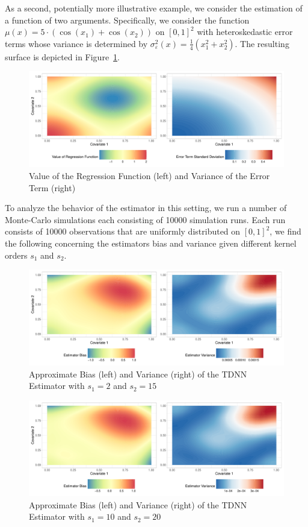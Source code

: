 \newpage
As a second, potentially more illustrative example, we consider the estimation of a function of two arguments.
Specifically, we consider the function $\mu(x) = 5 \cdot \left(\cos(x_1) + \cos(x_2)\right)$ on $[0,1]^2$ with heteroskedastic error terms whose variance is determined by $\sigma_{\varepsilon}^2(x) = \frac{1}{4}\left(x_1^2 + x_2^2\right)$.
The resulting surface is depicted in Figure~\ref{fig:reg_surface}.
\begin{figure}[H]
	\centering
	\includegraphics[width = \textwidth]{../Graphics/Reg_Exmp1.pdf}
	\caption{Value of the Regression Function (left) and Variance of the Error Term (right)}
	\label{fig:reg_surface}
\end{figure}
To analyze the behavior of the estimator in this setting, we run a number of Monte-Carlo simulations each consisting of 10000 simulation runs.
Each run consists of 10000 observations that are uniformly distributed on $[0,1]^2$, we find the following concerning the estimators bias and variance given different kernel orders $s_1$ and $s_2$.
\begin{figure}[H]
	\centering
	\includegraphics[width = \textwidth]{../Graphics/Reg_Exmp1b_Est.pdf}
	\caption{Approximate Bias (left) and Variance (right) of the TDNN Estimator with $s_1 = 2$ and $s_2 = 15$}
	\label{fig:est_bias_var_2}
\end{figure}
\begin{figure}[H]
	\centering
	\includegraphics[width = \textwidth]{../Graphics/Reg_Exmp1_Est.pdf}
	\caption{Approximate Bias (left) and Variance (right) of the TDNN Estimator with $s_1 = 10$ and $s_2 = 20$}
	\label{fig:est_bias_var}
\end{figure}
